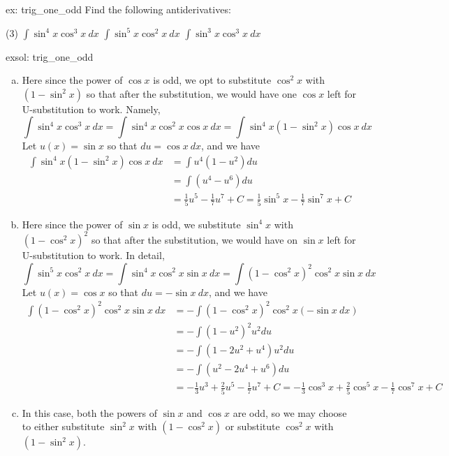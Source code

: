 \begin{ex}[]{ex: trig_one_odd}
Find the following antiderivatives:
    \begin{tasks}(3)
        \task $\int \sin^4 x \cos^3 x~dx$
        \task $\int \sin^5 x \cos^2 x~dx$
        \task $\int \sin^3 x \cos^3 x~dx$
    \end{tasks}
\end{ex}
\begin{exsol}[]{exsol: trig_one_odd}
    \begin{enumerate}[a)]
        \item Here since the power of $\cos x$ is odd, we opt to substitute $\cos^2 x$ with $(1-\sin^2 x)$ so that after the substitution, we would have one $\cos x$ left for U-substitution to work.  Namely,
        \[\int \sin^4 x \cos^3 x~dx = \int \sin^4 x \cos^2x \cos x~dx = \int \sin^4 x (1-\sin^2 x) \cos x~dx\]
        Let $u(x) = \sin x$ so that $du = \cos x~dx$, and we have
        \begin{align*}
            \int \sin^4 x (1-\sin^2 x) \cos x~dx &= \int u^4 (1-u^2) du\\
            &= \int (u^4 - u^6) du\\
            &= \frac{1}{5}u^5 - \frac{1}{7}u^7 + C = \frac{1}{5}\sin^5 x - \frac{1}{7}\sin^7 x + C
        \end{align*}
        \item Here since the power of $\sin x$ is odd, we substitute $\sin^4 x$ with $(1-\cos^2 x)^2$ so that after the substitution, we would have on $\sin x$ left for U-substitution to work.  In detail,
        \[\int \sin^5 x \cos^2 x~dx = \int \sin^4 x \cos^2x \sin x~dx = \int (1-\cos^2x)^2 \cos^2x \sin x~dx\]
        Let $u(x) = \cos x$ so that $du = -\sin x~dx$, and we have
        \begin{align*}
            \int (1-\cos^2x)^2 \cos^2x \sin x~dx &= -\int (1-\cos^2x)^2 \cos^2x (-\sin x~dx)\\
            &= -\int (1 - u^2)^2 u^2 du\\
            &= -\int (1 - 2u^2 + u^4)u^2 du\\
            &= -\int (u^2 - 2u^4 + u^6) du\\
            &= -\frac{1}{3}u^3 + \frac{2}{5}u^5 - \frac{1}{7}u^7 + C = -\frac{1}{3}\cos^3x + \frac{2}{5}\cos^5x - \frac{1}{7}\cos^7x + C
        \end{align*}
        \item In this case, both the powers of $\sin x$ and $\cos x$ are odd, so we may choose to either substitute $\sin^2x$ with $(1-\cos^2x)$ or substitute $\cos^2x$ with $(1-\sin^2x)$.\\

\end{enumerate}
\end{exsol}
